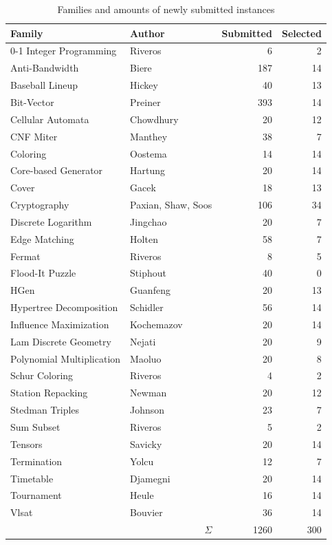 \documentclass{elsarticle}
\begin{document}
\begin{table}[t]
\small
\centering
\begin{tabular}{|l|l||rr|}
\hline
Family & Author & Submitted & Selected\\
\hline\hline
0-1 Integer Programming & Riveros & 6 & 2 \\
Anti-Bandwidth & Biere & 187 & 14 \\
Baseball Lineup & Hickey & 40 & 13 \\
Bit-Vector & Preiner & 393 & 14 \\
Cellular Automata & Chowdhury & 20 & 12 \\
CNF Miter & Manthey & 38 & 7 \\
Coloring & Oostema & 14 & 14 \\
Core-based Generator & Hartung & 20 & 14 \\
Cover & Gacek & 18 & 13 \\
Cryptography & Paxian, Shaw, Soos & 106 & 34 \\
Discrete Logarithm & Jingchao & 20 & 7 \\
Edge Matching & Holten & 58 & 7 \\
Fermat & Riveros & 8 & 5 \\
Flood-It Puzzle & Stiphout & 40 & 0 \\
HGen & Guanfeng & 20 & 13 \\
Hypertree Decomposition & Schidler & 56 & 14 \\
Influence Maximization & Kochemazov & 20 & 14 \\
Lam Discrete Geometry & Nejati & 20 & 9 \\
Polynomial Multiplication & Maoluo & 20 & 8 \\
Schur Coloring & Riveros & 4 & 2 \\
Station Repacking & Newman & 20 & 12 \\
Stedman Triples & Johnson & 23 & 7 \\
Sum Subset & Riveros & 5 & 2 \\
Tensors & Savicky & 20 & 14 \\
Termination & Yolcu & 12 & 7 \\
Timetable & Djamegni & 20 & 14 \\
Tournament & Heule & 16 & 14 \\
Vlsat & Bouvier & 36 & 14 \\
\hline
\multicolumn{2}{|r||}{$\Sigma$} & 1260 & 300 \\
\hline
\end{tabular}
\caption{Families and amounts of newly submitted instances}
\label{tab:families}
\end{table}
\end{document}

